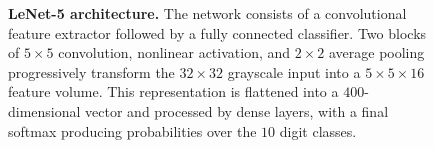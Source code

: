 \begin{figure}[htbp]
\begin{tikzpicture}
\end{tikzpicture}
\caption{\textbf{LeNet-5 architecture.} The network consists of a convolutional feature extractor followed by a fully connected classifier. Two blocks of $5 \times 5$ convolution, nonlinear activation, and $2 \times 2$ average pooling progressively transform the $32 \times 32$ grayscale input into a $5 \times 5 \times 16$ feature volume. This representation is flattened into a $400$-dimensional vector and processed by dense layers, with a final softmax producing probabilities over the $10$ digit classes.}
\label{fig:lenet-5-architecture}
\end{figure}